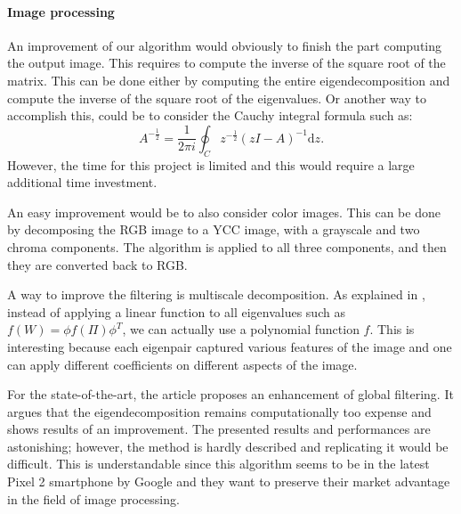 \paragraph{Image processing}
An improvement of our algorithm would obviously to finish the part computing the output image.
This requires to compute the inverse of the square root of the matrix.
This can be done either by computing the entire eigendecomposition and compute the inverse of the square root of the eigenvalues.
Or another way to accomplish this, could be to consider the Cauchy integral formula such as:
\[A^{-\frac{1}{2}} = \frac{1}{2\pi i} \oint_C z^{-\frac{1}{2}} (zI - A)^{-1} \mathrm{d}z.\]
However, the time for this project is limited and this would require a large additional time investment.

An easy improvement would be to also consider color images.
This can be done by decomposing the RGB image to a YCC image, with a grayscale and two chroma components.
The algorithm is applied to all three components, and then they are converted back to RGB.

A way to improve the filtering is multiscale decomposition.
As explained in \cite{talebi_nonlocal_2014}, instead of applying a linear function to all eigenvalues such as \(f(W) = \phi f(\Pi) \phi^T\), we can actually use a polynomial function \(f\).
This is interesting because each eigenpair captured various features of the image and one can apply different coefficients on different aspects of the image.

For the state-of-the-art, the article \cite{talebi_fast_2016} proposes an enhancement of global filtering.
It argues that the eigendecomposition remains computationally too expense and shows results of an improvement.
The presented results and performances are astonishing; however, the method is hardly described and replicating it would be difficult.
This is understandable since this algorithm seems to be in the latest Pixel 2 smartphone by Google and they want to preserve their market advantage in the field of image processing.
